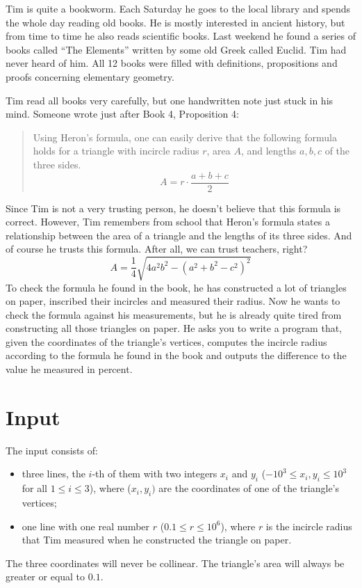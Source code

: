 
Tim is quite a bookworm.
Each Saturday he goes to the local library and spends the whole day reading old books.
He is mostly interested in ancient history, but from time to time he also reads scientific books.
Last weekend he found a series of books called ``The Elements'' written by some old Greek called Euclid.
Tim had never heard of him.
All 12 books were filled with definitions, propositions and proofs concerning elementary geometry.

Tim read all books very carefully, but one handwritten note just stuck in his mind.
Someone wrote just after Book 4, Proposition 4:
\begin{quote}
Using Heron's formula, one can easily derive that the following formula holds for a triangle with incircle radius $r$, area $A$, and lengths $a, b, c$ of the three sides.
\[ A = r\cdot \frac{a+b+c}{2}\]
\end{quote}
Since Tim is not a very trusting person, he doesn't believe that this formula is correct.
However, Tim remembers from school that Heron's formula states a relationship between the area of a triangle and the lengths of its three sides.
And of course he trusts this formula.
After all, we can trust teachers, right?
\[
	A = \frac{1}{4}\sqrt{4a^2b^2 - (a^2 + b^2 - c^2)^2}
\]
To check the formula he found in the book, he has constructed a lot of triangles on paper, inscribed their incircles and measured their radius.
Now he wants to check the formula against his measurements, but he is already quite tired from constructing all those triangles on paper.
He asks you to write a program that, given the coordinates of the triangle's vertices, computes the incircle radius according to the formula he found in the book and outputs the difference to the value he measured in percent.

\section*{Input}

The input consists of:
\begin{itemize}
\item three lines, the $i$-th of them with two integers $x_i$ and $y_i$ ($-10^3 \leq x_i,y_i \leq 10^3$ for all $1\leq i\leq 3$), where ($x_i, y_i)$ are the coordinates of one of the triangle's vertices;
\item one line with one real number $r$ ($0.1 \leq r \leq 10^6$), where $r$ is the incircle radius that Tim measured when he constructed the triangle on paper.
\end{itemize}
The three coordinates will never be collinear. The triangle's area will always be greater or equal to $0.1$.

